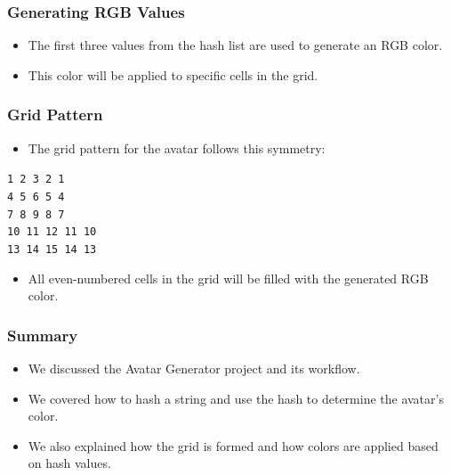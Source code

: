 \documentclass[aspectratio=169, table]{beamer}
\begin{document}
	\begin{frame}
		\frametitle{Generating RGB Values}
		\begin{itemize}
			\item The first three values from the hash list are used to generate an RGB color.
			\item This color will be applied to specific cells in the grid.
		\end{itemize}
	\end{frame}
	
	\begin{frame}
		\frametitle{Grid Pattern}
		\begin{itemize}
			\item The grid pattern for the avatar follows this symmetry:
		\end{itemize}
		\begin{center}
			\texttt{1 2 3 2 1} \\
			\texttt{4 5 6 5 4} \\
			\texttt{7 8 9 8 7} \\
			\texttt{10 11 12 11 10} \\
			\texttt{13 14 15 14 13}
		\end{center}
		\begin{itemize}
			\item All even-numbered cells in the grid will be filled with the generated RGB color.
		\end{itemize}
	\end{frame}
	
	\begin{frame}
		\frametitle{Summary}
		\begin{itemize}
			\item We discussed the Avatar Generator project and its workflow.
			\item We covered how to hash a string and use the hash to determine the avatar's color.
			\item We also explained how the grid is formed and how colors are applied based on hash values.
		\end{itemize}
	\end{frame}
	
\end{document}
